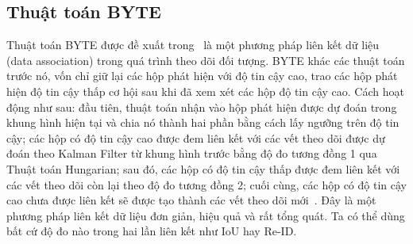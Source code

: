 \subsection{Thuật toán BYTE}

Thuật toán BYTE được đề xuất trong~\cite{zhang2022bytetrack} là một phương pháp
liên kết dữ liệu (data association) trong quá trình theo dõi đối tượng. BYTE
khác các thuật toán trước nó, vốn chỉ giữ lại các hộp phát hiện với độ tin cậy
cao, trao các hộp phát hiện độ tin cậy thấp cơ hội sau khi đã xem xét các hộp
độ tin cậy cao. Cách hoạt động như sau: đầu tiên, thuật toán nhận vào hộp phát
hiện được dự đoán trong khung hình hiện tại và chia nó thành hai phần bằng cách
lấy ngưỡng trên độ tin cậy; các hộp có độ tin cậy cao được đem liên kết với các
vết theo dõi được dự đoán theo Kalman Filter từ khung hình trước bằng độ đo
tương đồng 1 qua Thuật toán Hungarian; sau đó, các hộp có độ tin cậy thấp được
đem liên kết với các vết theo dõi còn lại theo độ đo tương đồng 2; cuối cùng,
các hộp có độ tin cậy cao chưa được liên kết sẽ được tạo thành các vết theo dõi
mới~\cite{zhang2022bytetrack}. Đây là một phương pháp liên kết dữ liệu đơn
giản, hiệu quả và rất tổng quát. Ta có thể dùng bất cứ độ đo nào trong hai lần
liên kết như IoU hay Re-ID.
